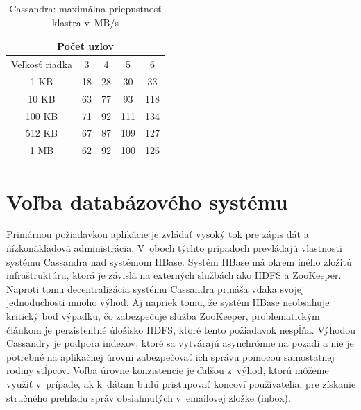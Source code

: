 \documentclass[11pt,twoside,a4paper]{book}
\begin{document}
\begin{table}[htp]
\begin{center}
\begin{tabular}{|c|c|c|c|c|}
\hline
\multicolumn{5}{|c|}{Počet uzlov}  \\
\hline Veľkosť riadka & 3 & 4 & 5 & 6\\ 
\hline
\hline 1 KB & 18 & 28 & 30 & 33\\ 
\hline 10 KB & 63 & 77 & 93 & 118 \\ 
\hline 100 KB & 71 & 92 & 111 & 134\\ 
\hline 512 KB & 67 & 87 & 109 & 127\\  
\hline 1 MB & 62 & 92 & 100 & 126\\ 
\hline
\end{tabular} 
\end{center}
\caption{Cassandra: maximálna priepustnosť klastra v~MB/s}
\label{tab:CPerf1}
\end{table}





\section{Voľba databázového systému}

Primárnou požiadavkou aplikácie je zvládať vysoký tok pre zápis dát a nízkonákladová administrácia. V~oboch týchto prípadoch prevládajú vlastnosti systému Cassandra nad systémom HBase. Systém HBase má okrem iného zložitú infraštruktúru, ktorá je závislá na externých službách ako HDFS a ZooKeeper. Naproti tomu decentralizácia systému Cassandra prináša vďaka svojej jednoduchosti mnoho výhod. Aj napriek tomu, že systém HBase neobsahuje kritický bod výpadku, čo zabezpečuje služba ZooKeeper, problematickým článkom je perzistentné úložisko HDFS, ktoré tento požiadavok nespĺňa. Výhodou Cassandry je podpora indexov, ktoré sa vytvárajú asynchrónne na pozadí a nie je potrebné na aplikačnej úrovni zabezpečovať ich správu pomocou samostatnej rodiny stĺpcov. Voľba úrovne konzistencie je ďalšou z~výhod, ktorú môžeme využiť v~prípade, ak k~dátam budú pristupovať koncoví používatelia, pre získanie stručného prehľadu správ obsiahnutých v~emailovej zložke (inbox).
\end{document}
